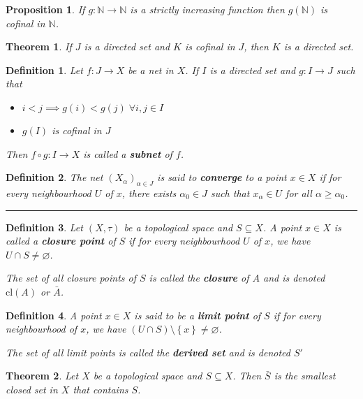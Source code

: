 \documentclass[14pt,twoside]{extreport}
\newcommand{\hhrule}{\vspace{1cm}\hrule\vspace{1cm}}
\theoremstyle{dotless}
\newtheorem*{defn}{Definition}
\newtheorem*{thm}{Theorem} %
\newtheorem*{prop}{Proposition} %
\begin{document}
\begin{prop}
    If $g \colon \mathbb{N} \to \mathbb{N}$ is a strictly increasing function then $g\left (\mathbb{N}\right )$ is cofinal in $\mathbb{N}$.
\end{prop}

\begin{thm}
    If $J$ is a directed set and $K$ is cofinal in $J$, then $K$ is a directed set.
\end{thm}

\begin{defn}
    Let $f \colon J \to X$ be a net in $X$. If $I$ is a directed set and $g \colon I \to J$ such that
    \begin{itemize}
        \item $i < j \implies g\left (i\right ) < g\left (j\right ) \;\forall i, j \in I$
        \item $g\left (I\right )$ is cofinal in $J$
    \end{itemize}
    Then $f \circ g \colon I \to X$ is called a \textbf{subnet} of $f$.
\end{defn}

\begin{defn}
    The net $\left (X_\alpha\right )_{\alpha \in J}$ is said to \textbf{converge} to a point $x \in X$ if for every neighbourhood $U$ of $x$, there exists $\alpha_0 \in J$ such that $x_\alpha \in U$ for all $\alpha \geq \alpha_0$.
\end{defn}

\hhrule 

\begin{defn}
    Let $\left (X, \tau\right )$ be a topological space and $S \subseteq X$. A point $x \in X$ is called a \textbf{closure point} of $S$ if for every neighbourhood $U$ of $x$, we have $U \cap S \neq  \varnothing$.

    The set of all closure points of $S$ is called the \textbf{closure} of $A$ and is denoted $\text{cl}\left (A\right )$ or $\bar{A}$.
\end{defn}

\begin{defn}
    A point $x \in X$ is said to be a \textbf{limit point} of $S$ if for every neighbourhood of $x$, we have $\left (U \cap S\right ) \setminus \left\{ x \right\} \neq  \varnothing $.

    The set of all limit points is called the \textbf{derived set} and is denoted $S'$
\end{defn}

\begin{thm}
    Let $X$ be a topological space and $S \subseteq X$. Then $\bar{S}$ is the smallest closed set in $X$ that contains $S$.
\end{thm}
\end{document}
